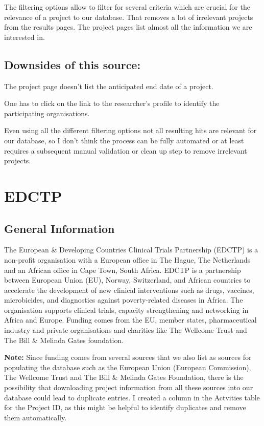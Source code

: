 \documentclass[
]{book}
\begin{document}
The filtering options allow to filter for several criteria which are crucial for the relevance of a project to our database. That removes a lot of irrelevant projects from the results pages. The project pages list almost all the information we are interested in.

\hypertarget{downsides-of-this-source}{%
\subsection{Downsides of this source:}\label{downsides-of-this-source}}

The project page doesn't list the anticipated end date of a project.

One has to click on the link to the researcher's profile to identify the participating organisations.

Even using all the different filtering options not all resulting hits are relevant for our database, so I don't think the process can be fully automated or at least requires a subsequent manual validation or clean up step to remove irrelevant projects.

\hypertarget{update-edctp}{%
\section{EDCTP}\label{update-edctp}}

\hypertarget{general-information-2}{%
\subsection{General Information}\label{general-information-2}}

The European \& Developing Countries Clinical Trials Partnership (EDCTP) is a non-profit organisation with a European office in The Hague, The Netherlands and an African office in Cape Town, South Africa. EDCTP is a partnership between European Union (EU), Norway, Switzerland, and African countries to accelerate the development of new clinical interventions such as drugs, vaccines, microbicides, and diagnostics against poverty-related diseases in Africa. The organisation supports clinical trials, capacity strengthening and networking in Africa and Europe. Funding comes from the EU, member states, pharmaceutical industry and private organisations and charities like The Wellcome Trust and The Bill \& Melinda Gates foundation.

\textbf{Note:} Since funding comes from several sources that we also list as sources for populating the database such as the European Union (European Commission), The Wellcome Trust and The Bill \& Melinda Gates Foundation, there is the possibility that downloading project information from all these sources into our database could lead to duplicate entries. I created a column in the Actvities table for the Project ID, as this might be helpful to identify duplicates and remove them automatically.
\end{document}
